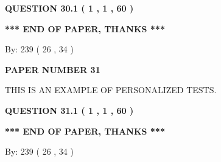 \documentclass[12pt]{article}
\begin{document}
{\textbf{\Large{QUESTION
30.1 
 (           1 ,           1 ,          60 )
}}}
  
  
 
 

 
 
   
   
 \vspace{0.2in}
 
   
   
   
   
\vspace{1.0in} 
{\textbf{\large{ *** END OF PAPER, THANKS *** }}} 
   
   
\hspace{1.0in} By: 
         239 (          26 ,           34 )
   
   
   
   
\newpage 
\setcounter{page}{ 
    31001 } 
   
   
   
   
 {\textbf{ \Large{ PAPER NUMBER           31  }}}
   
   
\vspace{0.2in}
   
   
   
   
   
   
 \vspace{0.2in}
{\Huge  THIS IS AN EXAMPLE OF}
{\Huge  PERSONALIZED TESTS. }
   
   
  
\vspace{0.2in}
  
{\textbf{\Large{QUESTION
31.1 
 (           1 ,           1 ,          60 )
}}}
  
  
 
 

 
 
   
   
 \vspace{0.2in}
 
   
   
   
   
\vspace{1.0in} 
{\textbf{\large{ *** END OF PAPER, THANKS *** }}} 
   
   
\hspace{1.0in} By: 
         239 (          26 ,           34 )
   
   
   
   
\newpage 
\setcounter{page}{ 
    32001 } 
   
\end{document}
